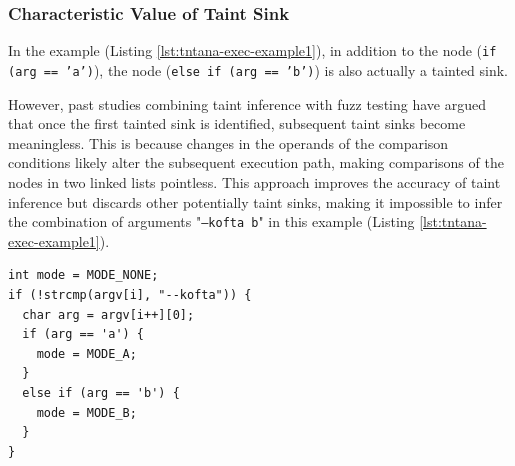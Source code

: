 \subsubsection{Characteristic Value of Taint Sink} %
\label{subsec:tntana-chara}

In the example (Listing \ref{lst:tntana-exec-example1}), in addition to the node (\texttt{if (arg == 'a')}), the node (\texttt{else if (arg == 'b')}) is also actually a tainted sink.

However, past studies combining taint inference with fuzz testing have argued that once the first tainted sink is identified, subsequent taint sinks become meaningless. This is because changes in the operands of the comparison conditions likely alter the subsequent execution path, making comparisons of the nodes in two linked lists pointless. This approach improves the accuracy of taint inference but discards other potentially taint sinks, making it impossible to infer the combination of arguments "\texttt{--kofta b}" in this example (Listing \ref{lst:tntana-exec-example1}).
%
\iftrue

\begin{lstlisting}[float=h!, caption={\footnotesize Taint Inference Execution (Example 1)}, label=lst:tntana-exec-example1]
int mode = MODE_NONE;
if (!strcmp(argv[i], "--kofta")) {
  char arg = argv[i++][0];
  if (arg == 'a') {
    mode = MODE_A;
  }
  else if (arg == 'b') {
    mode = MODE_B;
  }
}
\end{lstlisting}

\fi

\iffalse

